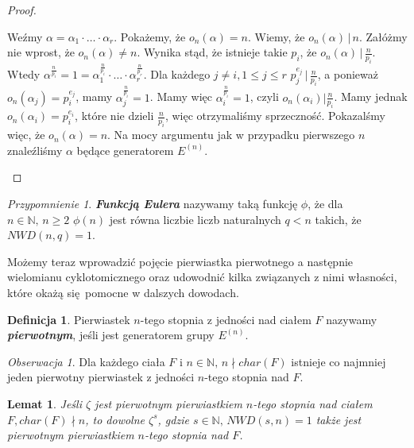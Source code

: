 \documentclass[declaration,shortabstract]{iithesis}
\theoremstyle{definition}
\newtheorem{definition}{Definicja}
\theoremstyle{remark} \newtheorem{observation}{Obserwacja}
\theoremstyle{plain} \newtheorem{theorem}{Twierdzenie}
\theoremstyle{plain} \newtheorem{lemma}{Lemat}
\theoremstyle{remark} \newtheorem*{remark*}{Uwaga}
\theoremstyle{reminder} \newtheorem*{reminder*}{Przypomnienie}
\begin{document}
\begin{proof}
\begin{enumerate}[label=(\arabic*),leftmargin=.4in]
\begin{enumerate}[label=(3.\arabic*)]
            Weźmy $\alpha = \alpha_1 \cdot \dots \cdot \alpha_r$. Pokażemy, że $o_n(\alpha) = n$. Wiemy, że $o_n(\alpha) \, | \, n$. Załóżmy nie wprost, że $o_n(\alpha) \neq n$. Wynika stąd, że istnieje takie $p_i$, że $o_n(\alpha) \, | \, \frac{n}{p_i}$. Wtedy $\alpha^{\frac{n}{p_i}} = 1 = \alpha_1^{\frac{n}{p_i}} \cdot \dots \cdot \alpha_r^{\frac{n}{p_r}}$. Dla każdego $j \neq i, 1 \leq j \leq r$ $p_j^{e_j} \, | \, \frac{n}{p_i}$, a ponieważ $o_n(\alpha_j) = p_i^{e_j}$, mamy $\alpha_j^{\frac{n}{p_i}} = 1$. Mamy więc $\alpha_i^{\frac{n}{p_i}} = 1$, czyli $o_n(\alpha_i) | \frac{n}{p_i}$. Mamy jednak $o_n(\alpha_i) = p_i^{e_i}$, które nie dzieli $\frac{n}{p_i}$, więc otrzymaliśmy sprzeczność. Pokazalśmy więc, że $o_n(\alpha) = n$. Na mocy argumentu jak w przypadku pierwszego $n$ znaleźliśmy $\alpha$ będące generatorem $E^{(n)}$.
        \end{enumerate}
    \end{enumerate}
\end{proof}
    

\begin{reminder*}
	\textbf{\textit{Funkcją Eulera}} nazywamy taką funkcję $\phi$, że dla $n \in \mathbb{N}, \, n \geq 2$ $\phi(n)$ jest równa liczbie liczb naturalnych $q < n$ takich, że $NWD(n, q) = 1$. 
\end{reminder*}

Możemy teraz wprowadzić pojęcie pierwiastka pierwotnego a następnie wielomianu cyklotomicznego oraz udowodnić kilka związanych z nimi własności, które okażą się pomocne w dalszych dowodach.

\begin{definition}
	Pierwiastek $n$-tego stopnia z jedności nad ciałem $F$ nazywamy \textbf{\textit{pierwotnym}}, jeśli jest generatorem grupy $E^{(n)}$.
\end{definition}
	
\begin{observation}
	Dla każdego ciała $F$ i $n \in \mathbb{N}, \, n \nmid char(F)$  istnieje co najmniej jeden pierwotny pierwiastek z jedności $n$-tego stopnia nad $F$.
\end{observation}
	
\begin{lemma}\label{pierwotne}
	Jeśli $\zeta$ jest pierwotnym pierwiastkiem $n$-tego stopnia nad ciałem $F, char(F) \nmid n$, to dowolne $\zeta^s$, gdzie $s \in \mathbb{N}, \, NWD(s, n) = 1$ także jest pierwotnym pierwiastkiem $n$-tego stopnia nad $F$.
\end{lemma}
	
\end{document}
